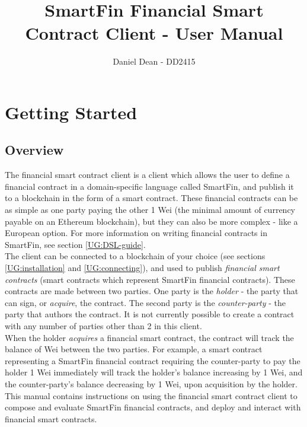 \documentclass{article}
\title{SmartFin Financial Smart Contract Client - User Manual}
\date{}
\author{Daniel Dean - DD2415}
\begin{document}
\maketitle
\clearpage

\tableofcontents
\clearpage


\section{Getting Started}

\subsection{Overview}

The financial smart contract client is a client which allows the user to define a financial contract in a domain-specific language called SmartFin, and publish it to a blockchain in the form of a smart contract. These financial contracts can be as simple as one party paying the other 1 Wei (the minimal amount of currency payable on an Ethereum blockchain), but they can also be more complex - like a European option. For more information on writing financial contracts in SmartFin, see section \ref{UG:DSL-guide}. \\

The client can be connected to a blockchain of your choice (see sections \ref{UG:installation} and \ref{UG:connecting}), and used to publish \textit{financial smart contracts} (smart contracts which represent SmartFin financial contracts). These contracts are made between two parties. One party is the \textit{holder} - the party that can sign, or \textit{acquire}, the contract. The second party is the \textit{counter-party} - the party that authors the contract. It is not currently possible to create a contract with any number of parties other than 2 in this client. \\

When the holder \textit{acquires} a financial smart contract, the contract will track the balance of Wei between the two parties. For example, a smart contract representing a SmartFin financial contract requiring the counter-party to pay the holder 1 Wei immediately will track the holder's balance increasing by 1 Wei, and the counter-party's balance decreasing by 1 Wei, upon acquisition by the holder. \\

This manual contains instructions on using the financial smart contract client to compose and evaluate SmartFin financial contracts, and deploy and interact with financial smart contracts.
\end{document}
